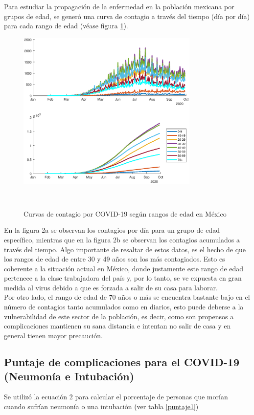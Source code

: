 \documentclass[12pt,a4paper]{article}
\begin{document}
Para estudiar la propagación de la enfermedad en la población mexicana por grupos de edad, se generó una curva de contagio a través del tiempo (día por día) para cada rango de edad (véase figura \ref{Figura2}). \\
\begin{figure}
\centering
\includegraphics[width = 0.8\textwidth]{Figura2.eps}
\caption{Curvas de contagio por COVID-19 según rangos de edad en México} \\ 
\label{Figura2}
\end{figure}

En la figura 2a se observan los contagios por día para un grupo de edad específico, mientras que en la figura 2b se observan los contagios acumulados a través del tiempo. Algo importante de resaltar de estos datos, es el hecho de que los rangos de edad de entre 30 y 49 años son los más contagiados. Esto es coherente a la situación actual en México, donde justamente este rango de edad pertenece a la clase trabajadora del país y, por lo tanto, se ve expuesta en gran medida al virus debido a que es forzada a salir de su casa para laborar.\\

Por otro lado, el rango de edad de 70 años o más se encuentra bastante bajo en el número de contagios tanto acumulados como en diarios, esto puede deberse a la vulnerabilidad de este sector de la población, es decir, como son propensos a complicaciones mantienen su sana distancia e intentan no salir de casa y en general tienen mayor precaución.
\setlength{\parindent}{1cm}

\subsection{Puntaje de complicaciones para el COVID-19 (Neumonía e Intubación)}
\setlength{\parindent}{0cm}
Se utilizó la ecuación 2 para calcular el porcentaje de personas que morían cuando sufrían neumonía o una intubación (ver tabla \ref{puntaje1})
\end{document}
